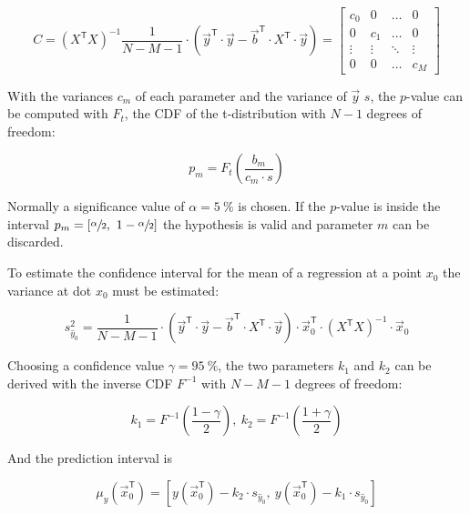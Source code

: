 \begin{equation}
C = \left(X^{\mathsf T} X\right)^{-1}\frac{1}{N-M-1}\cdot\left(\vec{y}^{\mathsf T}\cdot\vec{y}-\vec{b}^{\mathsf T}\cdot X^{\mathsf T}\cdot \vec{y}\right) = \begin{bmatrix}
c_0 & 0 & \dots & 0 \\
0 & c_1 & \dots & 0 \\
\vdots & \vdots & \ddots & \vdots \\
0 & 0 & \dots & c_M  
\end{bmatrix}
\end{equation}

With the variances $c_m$ of each parameter and the variance of $\vec{y}$ $s$, the $p$-value can be computed with $F_t$, the \ac{CDF} of the t-distribution with $N-1$ degrees of freedom:

\begin{equation}
p_m = F_t\left(\frac{b_m}{c_m\cdot s}\right)
\end{equation}

Normally a significance value of $\alpha = \SI{5}{\percent}$ is chosen. If the $p$-value is inside the interval $p_m=\left[\sfrac{\alpha}{2},\ 1-\sfrac{\alpha}{2}\right]$ the hypothesis is valid and parameter $m$ can be discarded.

To estimate the confidence interval for the mean of a regression at a point $x_0$ the variance at dot $x_0$ must be estimated: \cite{dffs}

\begin{equation}
s_{\hat{y}_0}^2 = \frac{1}{N-M-1}\cdot\left(\vec{y}^{\mathsf T}\cdot\vec{y}-\vec{b}^{\mathsf T}\cdot X^{\mathsf T}\cdot \vec{y}\right)\cdot \vec{x}_0^{\mathsf T}\cdot \left(X^{\mathsf T} X\right)^{-1} \cdot \vec{x}_0
\end{equation}

Choosing a confidence value $\gamma = \SI{95}{\percent}$, the two parameters $k_1$ and $k_2$ can be derived with the inverse \ac{CDF} $F^{-1}$ with $N-M-1$ degrees of freedom:

\begin{equation}
k_1 = F^{-1}\left(\frac{1-\gamma}{2}\right),\ k_2 = F^{-1}\left(\frac{1+\gamma}{2}\right)
\end{equation}

And the prediction interval is

\begin{equation}
\mu_y\left(\vec{x}_0^{\mathsf T}\right) =\left[ y\left(\vec{x}_0^{\mathsf T}\right)-k_2\cdot s_{\hat{y}_0},\ y\left(\vec{x}_0^{\mathsf T}\right)-k_1\cdot s_{\hat{y}_0}\right]
\end{equation}


